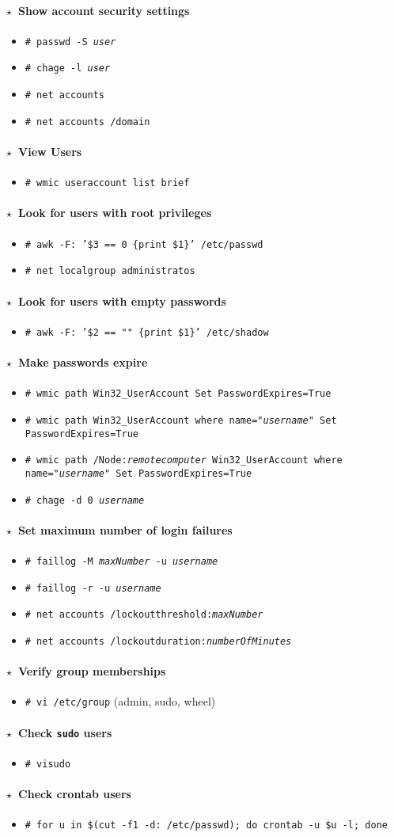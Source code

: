 \documentclass[10pt,landscape]{article}
\newcommand{\os}[1]{\texttt{\footnotesize{#1}}}
\newcommand{\unix}{\os{U}}
\newcommand{\linux}{\os{L}}
\newcommand{\windows}{\os{W}}
\newenvironment{action}[1]
  {\paragraph{$\star$~#1}\begin{itemize}[leftmargin=1cm]}
  {\end{itemize}}
\newcommand{\cmd}[2]{\item[#1] {\small\tt\# #2}}
\newcommand{\comment}[1]{\textrm{\small(#1)}}
\begin{document}
\begin{multicols*}{3}
\begin{action}{Show account security settings}
\cmd{\unix}{passwd -S \emph{user}}
\cmd{\linux}{chage -l \emph{user}}
\cmd{\windows}{net accounts}
\cmd{\windows}{net accounts /domain}
\end{action}

\begin{action}{View Users}
\cmd{\windows}{wmic useraccount list brief}
\end{action}

\begin{action}{Look for users with root privileges}
\cmd{\unix}{awk -F: '\$3 == 0 \{print \$1\}' /etc/passwd}
\cmd{\windows}{net localgroup administratos}
\end{action}

\begin{action}{Look for users with empty passwords}
\cmd{\unix}{awk -F: '\$2 == "" \{print \$1\}' /etc/shadow}
\end{action}

\begin{action}{Make passwords expire}
\cmd{\windows}{wmic path Win32\_UserAccount Set PasswordExpires=True}
\cmd{\windows}{wmic path Win32\_UserAccount where name="\emph{username}" Set PasswordExpires=True}
\cmd{\windows}{wmic path /Node:\emph{remotecomputer} Win32\_UserAccount where name="\emph{username}" Set PasswordExpires=True}
\cmd{\linux}{chage -d 0 \emph{username}}
\end{action}

\begin{action}{Set maximum number of login failures}
\cmd{\linux}{faillog -M \emph{maxNumber} -u \emph{username}}
\cmd{\linux}{faillog -r -u \emph{username}}
\cmd{\windows}{net accounts /lockoutthreshold:\emph{maxNumber}}
\cmd{\windows}{net accounts /lockoutduration:\emph{numberOfMinutes}}
\end{action}

\begin{action}{Verify group memberships}
\cmd{\unix}{vi /etc/group} \comment{admin, sudo, wheel}
\end{action}

\begin{action}{Check \texttt{sudo} users}
\cmd{\unix}{visudo}
\end{action}

\begin{action}{Check crontab users}
\cmd{\unix}{for u in \$(cut -f1 -d: /etc/passwd); do crontab -u \$u -l; done}
\end{action}


\end{multicols*}
\end{document}
